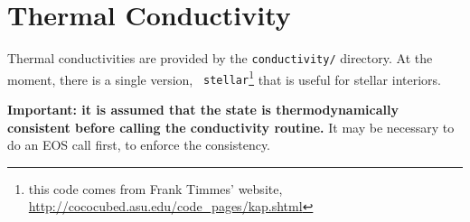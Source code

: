 \section{Thermal Conductivity}

Thermal conductivities are provided by the {\tt conductivity/}
directory.  At the moment, there is a single version, {\tt
  stellar}\footnote{this code comes from Frank Timmes' website,
  \url{http://cococubed.asu.edu/code_pages/kap.shtml}} that is useful
for stellar interiors.

{\bf Important: it is assumed that the state is thermodynamically consistent
before calling the conductivity routine.}  It may be necessary to do an EOS
call first, to enforce the consistency.
